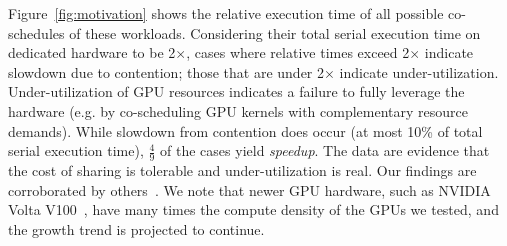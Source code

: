 Figure~\ref{fig:motivation} shows the relative execution time of all possible
co-schedules of these workloads. Considering their total serial execution time
on dedicated hardware to be 2$\times$, cases where relative times exceed
2$\times$ indicate slowdown due to contention; those that are under 2$\times$
indicate under-utilization. Under-utilization of GPU resources indicates a
failure to fully leverage the hardware (e.g. by co-scheduling GPU kernels with
complementary resource demands). While slowdown from contention does occur (at
most 10\% of total serial execution time), \( \frac{4}{9} \) of the cases
yield \emph{speedup}. The data are evidence that the cost of sharing is
tolerable and under-utilization is real. Our findings are corroborated by
others~\cite{long-list-of-citations-hangchen-dug-up}. We note that newer GPU
hardware, such as NVIDIA Volta V100~\cite{volta-nvidiaweb}, have many times
the compute density of the GPUs we tested, and the growth trend is projected
to continue.
